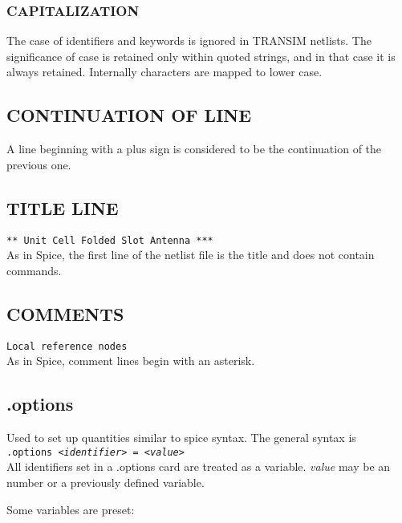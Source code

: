 \subsubsection[Capitalization]{CAPITALIZATION}

The case of identifiers and keywords is ignored in TRANSIM netlists.
The significance of case is retained only within quoted strings, and
in that case it is always retained.  Internally characters are mapped
to lower case.

\subsection[Continuation of line]{CONTINUATION OF LINE}

A line beginning with a plus sign is considered to be the continuation
of the previous one.

\subsection[Title line]{TITLE LINE}

{\tt *** Unit Cell Folded Slot Antenna ***} \medskip \\
As in Spice, the first line of the netlist file is the title and does
not contain commands.

\subsection[Comments]{COMMENTS}

{\tt * Local reference nodes} \medskip \\
As in Spice, comment lines begin with an asterisk.

\subsection[.options]{.options}

Used to set up quantities similar to spice syntax.  The general syntax
is \medskip\\ 
{\tt .options <{\it identifier}> = <{\it value}>} \medskip \\ 
All identifiers set in a .options card are treated as a
variable.  {\it value} may be an number or a previously defined
variable.

Some variables are preset:

